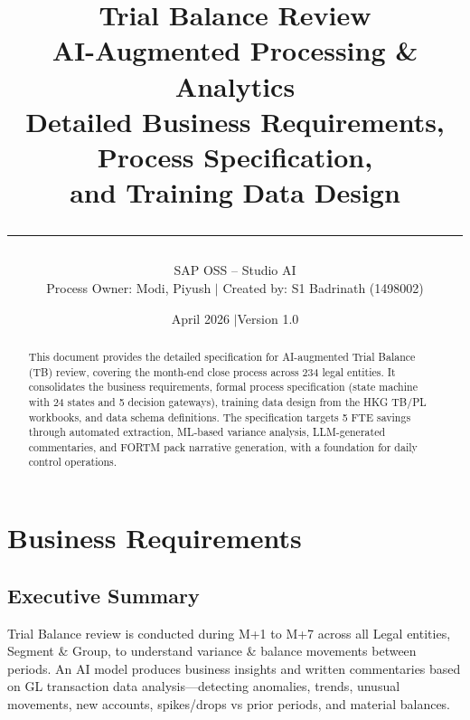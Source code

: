 \documentclass[11pt,a4paper]{article}
\title{%
    \vspace{-1cm}
    {\LARGE\bfseries Trial Balance Review}\\[0.3cm]
    {\Large AI-Augmented Processing \& Analytics}\\[0.5cm]
    {\large Detailed Business Requirements, Process Specification,\\
    and Training Data Design}\\[0.5cm]
    \rule{\textwidth}{1pt}
}
\author{%
    SAP OSS -- Studio AI\\
    \small Process Owner: Modi, Piyush $\mid$ Created by: S1 Badrinath (1498002)
}
\date{April 2026 \quad$\mid$\quad Version 1.0}
\begin{document}
\maketitle
\thispagestyle{empty}

\begin{abstract}
\noindent
This document provides the detailed specification for AI-augmented Trial Balance (TB) review,
covering the month-end close process across 234 legal entities. It consolidates the business
requirements, formal process specification (state machine with 24 states and 5 decision gateways),
training data design from the HKG TB/PL workbooks, and data schema definitions. The specification
targets 5 FTE savings through automated extraction, ML-based variance analysis, LLM-generated
commentaries, and FORTM pack narrative generation, with a foundation for daily control operations.
\end{abstract}

\tableofcontents
\newpage

\section{Business Requirements}
\label{sec:requirements}

\subsection{Executive Summary}

Trial Balance review is conducted during M+1 to M+7 across all Legal entities, Segment \& Group,
to understand variance \& balance movements between periods. An AI model produces business insights
and written commentaries based on GL transaction data analysis---detecting anomalies, trends, unusual
movements, new accounts, spikes/drops vs prior periods, and material balances.
\end{document}
